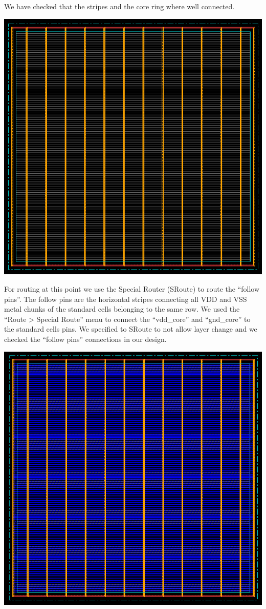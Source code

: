\documentclass[12pt]{article}
\begin{document}
We have checked that the stripes and the core ring where well connected.\\
\begin{center}
\includegraphics[scale=0.4]{pic/stripes.png}
\end{center}

For routing at this point we use the Special Router (SRoute) to route the “follow pins”. The follow pins are the horizontal stripes connecting all VDD and VSS metal chunks of the standard cells belonging to the same row. We used the “Route > Special Route” menu to connect the “vdd\_core” and “gnd\_core” to the standard cells pins. We specified to SRoute to not allow layer change and we checked the “follow pins” connections in our design.\\
\begin{center}
\includegraphics[scale=0.4]{pic/sroute.png}
\end{center}
\end{document}
